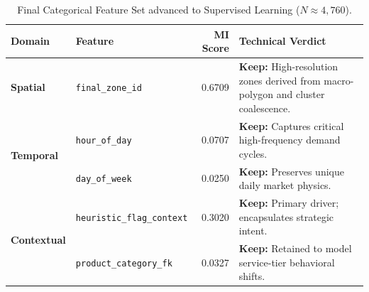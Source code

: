 \begin{table}[H]
    \centering
    \small
    \begin{tabularx}{\textwidth}{l l r X}
        \toprule
        \textbf{Domain} & \textbf{Feature} & \textbf{MI Score} & \textbf{Technical Verdict} \\
        \midrule
        \textbf{Spatial} & \texttt{final\_zone\_id} & 0.6709 & \textbf{Keep:} High-resolution zones derived from macro-polygon and cluster coalescence. \\
        \midrule
        \multirow{2}{*}{\textbf{Temporal}} 
        & \texttt{hour\_of\_day} & 0.0707 & \textbf{Keep:} Captures critical high-frequency demand cycles. \\
        & \texttt{day\_of\_week} & 0.0250 & \textbf{Keep:} Preserves unique daily market physics. \\
        \midrule
        \multirow{2}{*}{\textbf{Contextual}} 
        & \texttt{heuristic\_flag\_context} & 0.3020 & \textbf{Keep:} Primary driver; encapsulates strategic intent. \\
        & \texttt{product\_category\_fk} & 0.0327 & \textbf{Keep:} Retained to model service-tier behavioral shifts. \\
        \bottomrule
    \end{tabularx}
    \caption{Final Categorical Feature Set advanced to Supervised Learning ($N \approx 4,760$).}
    \label{tab:cfs_final_set}
\end{table}

